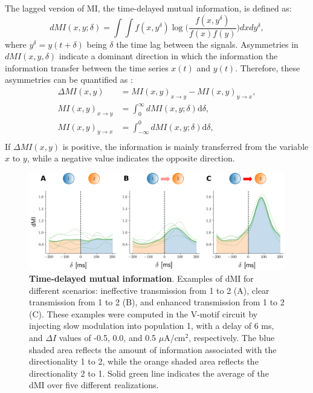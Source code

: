 \documentclass[../main.tex]{subfiles}
\begin{document}
The lagged version of MI, the time-delayed mutual information, is defined as:
\begin{equation}
    dMI(x,y;\delta) = \displaystyle\int\int 
    f(x,y^{\delta})\log \Bigg( \displaystyle\frac{f(x,y^{\delta})}{f(x)f(y)} \Bigg)dx dy^{\delta},
    \label{eq:time-delayed-mutual-information}
\end{equation}
where $y^{\delta} =  y(t+\delta)$ being $\delta$ the time lag between the signals.
Asymmetries in $dMI(x,y,\delta)$ indicate a dominant direction in which the information the information transfer between the time series $x(t)$ and $y(t)$.
Therefore, these asymmetries can be quantified as \citep{kirst_dynamic_2016}:
\begin{equation}
    \begin{aligned}
        \Delta MI(x,y) &=  MI(x,y)_{x\rightarrow y}-MI(x,y)_{y\rightarrow x}, \\
        MI(x,y)_{x\rightarrow y} &= \displaystyle\int_0^{\infty}dMI(x,y;\delta)\text{d}\delta, \\
        MI(x,y)_{y\rightarrow x} &= \displaystyle\int_{-\infty}^{0}dMI(x,y;\delta)\text{d}\delta, \\
    \end{aligned}
    \label{eq:difference_dMI}
\end{equation}
If $\Delta MI(x,y)$ is positive, the information is mainly transferred from the variable $x$ to $y$, while a negative value indicates the opposite direction.
\begin{figure}[!htb]
    \centering
    \includegraphics[width=\textwidth]{chapter2/figures/slow_stimulation.png}
    \caption{\textbf{Time-delayed mutual information}.
    Examples of dMI for different scenarios: ineffective transmission from 1 to 2 (A), clear transmission from 1 to 2 (B), and enhanced transmission from 1 to 2 (C).
    These examples were computed in the V-motif circuit by injecting slow modulation into population 1, with a delay of 6 ms, and $\Delta I$ values of -0.5, 0.0, and 0.5 $\mu$A/cm$^2$, respectively.
    The blue shaded area reflects the amount of information associated with the directionality 1 to 2, while the orange shaded area reflects the directionality 2 to 1.
    Solid green line indicates the average of the dMI over five different realizations.}
    \label{fig:slow-modulation-examples}
\end{figure}
\end{document}
